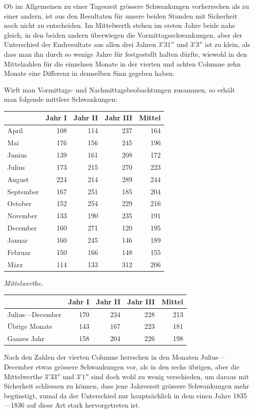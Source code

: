 Ob im Allgemeinen zu einer Tageszeit grössere Schwankungen vorherrschen als zu einer andern, ist aus den Resultaten für unsere beiden Stunden mit Sicherheit noch nicht zu entscheiden. Im Mittelwerth stehen im ersten Jahre beide
nahe gleich, in den beiden andern überwiegen die Vormittagsschwankungen, aber der Unterschied der Endresultate aus allen drei Jahren $3'31''$ und $3'3''$ ist zu klein, als dass man ihn durch so wenige Jahre für festgestellt halten dürfte, wiewohl in den Mittelzahlen für die einzelnen Monate in der vierten und achten Columne zehn Monate eine Differenz in demselben Sinn gegeben haben.

Wirft man Vormittags- und Nachmittagsbeobachtungen zusammen, so erhält man folgende mittlere Schwankungen:
\begin{center}\small
\begin{tabular}{l|r|r|r||r}
&Jahr I&Jahr II&Jahr III&Mittel\\\hline
April&108&114&237&164\\
Mai&176&156&245&196\\
Junius&139&161&208&172\\
Julius&173&215&270&223\\
August&224&214&289&244\\
September&167&251&185&204\\
October&152&254&229&216\\
November&133&190&235&191\\
December&160&271&120&195\\
Januar&160&245&146&189\\
Februar&150&166&148&155\\
März&114&133&312&206
\end{tabular}
\end{center}
\begin{center}\small
\textit{Mittelwerthe.}\par\smallskip
\begin{tabular}{l|r|r|r||r}
&Jahr I&Jahr II&Jahr III&Mittel\\\hline
Julius---December&170&234&228&213\\
Übrige Monate&143&167&223&181\\
Ganzes Jahr&158&204&226&198
\end{tabular}
\end{center}

Nach den Zahlen der vierten Columne herrschen in den Monaten Julius---December etwas grössere Schwankungen vor, als in den sechs übrigen, aber die Mittelwerthe $3'33''$ und $3'1''$ sind doch wohl zu wenig verschieden, um daraus mit Sicherheit schliessen zu können, dass jene Jahreszeit grössere Schwankungen mehr begünstigt, zumal da der Unterschied nur hauptsächlich in dem einen Jahre 1835---1836 auf diese Art stark hervorgetreten ist.


